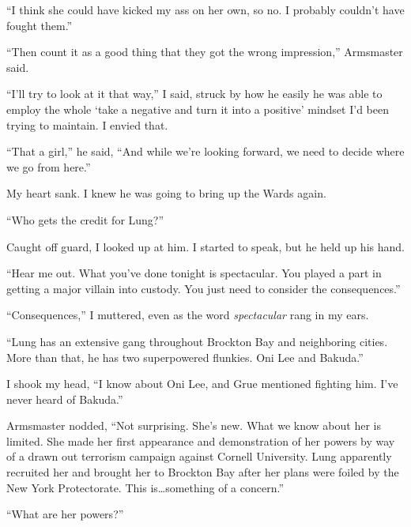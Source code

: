 ``I think she could have kicked my ass on her own, so no.  I probably couldn't have fought them.''



``Then count it as a good thing that they got the wrong impression,'' Armsmaster said.



``I'll try to look at it that way,'' I said, struck by how he easily he was able to employ the whole `take a negative and turn it into a positive' mindset I'd been trying to maintain.  I envied that.



``That a girl,'' he said, ``And while we're looking forward, we need to decide where we go from here.''



My heart sank.  I knew he was going to bring up the Wards again.



``Who gets the credit for Lung?''



Caught off guard, I looked up at him.  I started to speak, but he held up his hand.



``Hear me out.  What you've done tonight is spectacular.  You played a part in getting a major villain into custody.  You just need to consider the consequences.''



``Consequences,'' I muttered, even as the word \emph{spectacular} rang in my ears.



``Lung has an extensive gang throughout Brockton Bay and neighboring cities.  More than that, he has two superpowered flunkies.  Oni Lee and Bakuda.''



I shook my head, ``I know about Oni Lee, and Grue mentioned fighting him.  I've never heard of Bakuda.''



Armsmaster nodded, ``Not surprising.  She's new.  What we know about her is limited.  She made her first appearance and demonstration of her powers by way of a drawn out terrorism campaign against Cornell University.  Lung apparently recruited her and brought her to Brockton Bay after her plans were foiled by the New York Protectorate.  This is\ldots something of a concern.''



``What are her powers?''



